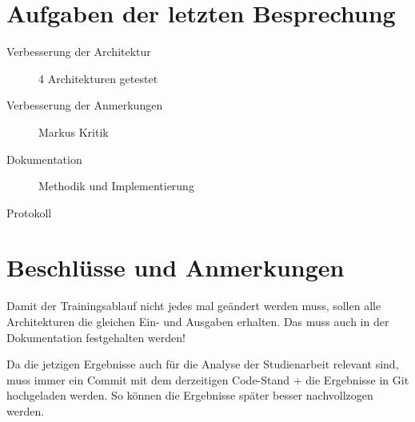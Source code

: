 
\newcommand{\Titel}{8. Protokoll}
\newcommand{\Teilnehmer}{Jonas Bürgel, Patrick Welter}
\newcommand{\DatumUndZeit}{21.03.2022 20:00-20:15}
\newcommand{\Ort}{Discord Meeting}
\newcommand{\Thema}{Erweiterung GAN: Anpassungen zur Qualitätssteigerung}


\section{Aufgaben der letzten Besprechung}
\begin{description}
	\item[Verbesserung der Architektur] 4 Architekturen getestet  \halfcheck
	\item[Verbesserung der Anmerkungen] Markus Kritik  \fullcheck
	\item[Dokumentation] Methodik und Implementierung  \halfcheck
	\item[Protokoll]  \fullcheck
\end{description}


\section{Beschlüsse und Anmerkungen}
\begin{description}[style=nextline]
	\item[Architekturen]
	Damit der Trainingsablauf nicht jedes mal geändert werden muss, sollen alle Architekturen die gleichen Ein- und Ausgaben erhalten. 
	Das muss auch in der Dokumentation festgehalten werden!
	
	\item[Trainingsergebnisse festhalten]
	Da die jetzigen Ergebnisse auch für die Analyse der Studienarbeit relevant sind, muss immer ein Commit mit dem derzeitigen Code-Stand + die Ergebnisse in Git hochgeladen werden. 
	So können die Ergebnisse später besser nachvollzogen werden.
\end{description}

